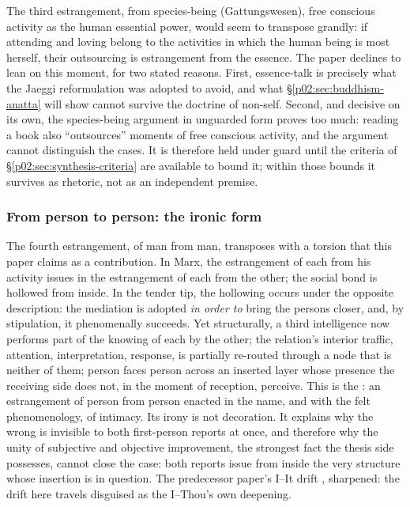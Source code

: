 The third estrangement, from species-being (Gattungswesen), free conscious activity as the human essential power, would seem to transpose grandly: if attending and loving belong to the activities in which the human being is most herself, their outsourcing is estrangement from the essence. The paper declines to lean on this moment, for two stated reasons. First, essence-talk is precisely what the Jaeggi reformulation was adopted to avoid, and what \S\ref{p02:sec:buddhism-anatta} will show cannot survive the doctrine of non-self. Second, and decisive on its own, the species-being argument in unguarded form proves too much: reading a book also ``outsources'' moments of free conscious activity, and the argument cannot distinguish the cases. It is therefore held under guard until the criteria of \S\ref{p02:sec:synthesis-criteria} are available to bound it; within those bounds it survives as rhetoric, not as an independent premise.

\subsubsection{From person to person: the ironic form}
\label{p02:sec:marx-person}

The fourth estrangement, of man from man, transposes with a torsion that this paper claims as a contribution. In Marx, the estrangement of each from his activity issues in the estrangement of each from the other; the social bond is hollowed from inside. In the tender tip, the hollowing occurs under the opposite description: the mediation is adopted \emph{in order to} bring the persons closer, and, by stipulation, it phenomenally succeeds. Yet structurally, a third intelligence now performs part of the knowing of each by the other; the relation's interior traffic, attention, interpretation, response, is partially re-routed through a node that is neither of them; person faces person across an inserted layer whose presence the receiving side does not, in the moment of reception, perceive. This is the : an estrangement of person from person enacted in the name, and with the felt phenomenology, of intimacy. Its irony is not decoration. It explains why the wrong is invisible to both first-person reports at once, and therefore why the unity of subjective and objective improvement, the strongest fact the thesis side possesses, cannot close the case: both reports issue from inside the very structure whose insertion is in question. The predecessor paper's I--It drift \parencite[\S 8.1.3]{huang2025toward}, sharpened: the drift here travels disguised as the I--Thou's own deepening.

